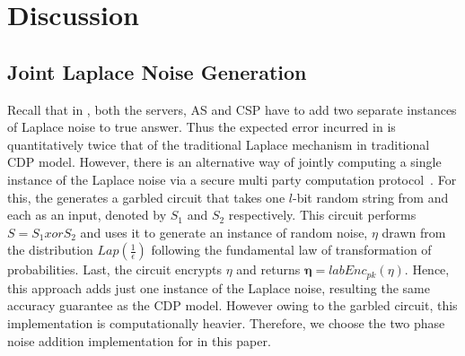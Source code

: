 \section{Discussion}
\subsection{Joint Laplace Noise Generation}\label{jointLap}
Recall that in \system,  both the servers, \textsf{AS} and \textsf{CSP} have to add two separate instances of Laplace noise to true answer. Thus the expected error incurred in \system is quantitatively twice that of the traditional Laplace mechanism in traditional \textsf{CDP} model. However, there is an alternative way of jointly computing a single instance of the Laplace noise via a secure multi party computation protocol~\cite{Djoin}. For this, the \CPS generates a garbled circuit that takes one $l$-bit random string from \CPS and \AS each as an input, denoted by $S_1$ and $S_2$ respectively. This circuit performs$S=S_1 xor S_2$  and uses it to generate an instance of random noise, $\eta$ drawn from the distribution $Lap(\frac{1}{\epsilon})$ following the fundamental law of transformation of probabilities.
Last, the circuit encrypts $\eta$ and returns $\boldsymbol{\eta}=labEnc_{pk}(\eta)$.
Hence, this approach adds just one instance of the Laplace noise, resulting the same accuracy guarantee as the \textsf{CDP} model. However owing to the garbled circuit, this implementation is computationally heavier. Therefore, we choose the two phase noise addition implementation for \system in this paper.
